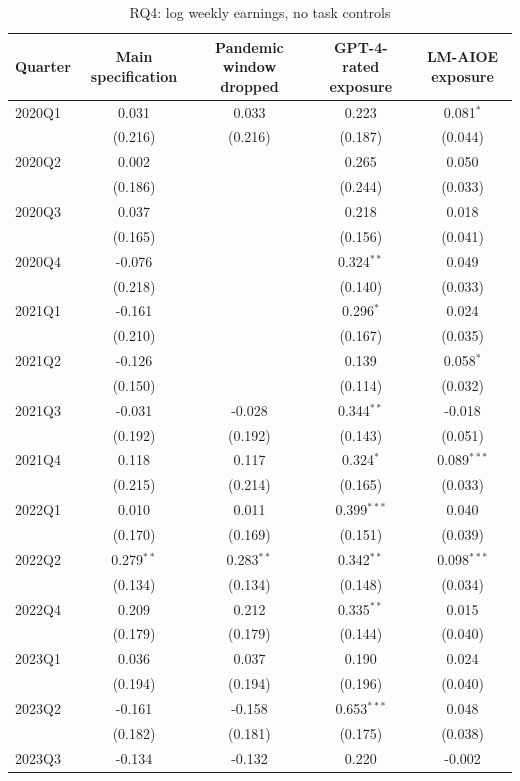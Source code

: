 \begin{table}[htbp]\centering
\caption{RQ4: log weekly earnings, no task controls}
\begin{tabular}{lcccc}
\toprule
Quarter & Main specification & Pandemic window dropped & GPT-4-rated exposure & LM-AIOE exposure \\
\midrule
2020Q1 & 0.031 & 0.033 & 0.223 & 0.081$^{*}$ \\
 & (0.216) & (0.216) & (0.187) & (0.044) \\
2020Q2 & 0.002 &  & 0.265 & 0.050 \\
 & (0.186) &  & (0.244) & (0.033) \\
2020Q3 & 0.037 &  & 0.218 & 0.018 \\
 & (0.165) &  & (0.156) & (0.041) \\
2020Q4 & -0.076 &  & 0.324$^{**}$ & 0.049 \\
 & (0.218) &  & (0.140) & (0.033) \\
2021Q1 & -0.161 &  & 0.296$^{*}$ & 0.024 \\
 & (0.210) &  & (0.167) & (0.035) \\
2021Q2 & -0.126 &  & 0.139 & 0.058$^{*}$ \\
 & (0.150) &  & (0.114) & (0.032) \\
2021Q3 & -0.031 & -0.028 & 0.344$^{**}$ & -0.018 \\
 & (0.192) & (0.192) & (0.143) & (0.051) \\
2021Q4 & 0.118 & 0.117 & 0.324$^{*}$ & 0.089$^{***}$ \\
 & (0.215) & (0.214) & (0.165) & (0.033) \\
2022Q1 & 0.010 & 0.011 & 0.399$^{***}$ & 0.040 \\
 & (0.170) & (0.169) & (0.151) & (0.039) \\
2022Q2 & 0.279$^{**}$ & 0.283$^{**}$ & 0.342$^{**}$ & 0.098$^{***}$ \\
 & (0.134) & (0.134) & (0.148) & (0.034) \\
2022Q4 & 0.209 & 0.212 & 0.335$^{**}$ & 0.015 \\
 & (0.179) & (0.179) & (0.144) & (0.040) \\
2023Q1 & 0.036 & 0.037 & 0.190 & 0.024 \\
 & (0.194) & (0.194) & (0.196) & (0.040) \\
2023Q2 & -0.161 & -0.158 & 0.653$^{***}$ & 0.048 \\
 & (0.182) & (0.181) & (0.175) & (0.038) \\
2023Q3 & -0.134 & -0.132 & 0.220 & -0.002 \\

\end{tabular}
\end{table}
